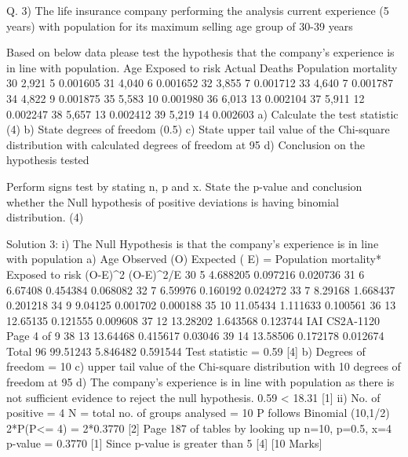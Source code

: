 \documentclass[a4paper,12pt]{article}
\begin{document}
Q. 3) The life insurance company performing the analysis current experience (5 years) with
population for its maximum selling age group of 30-39 years
\item  Based on below data please test the hypothesis that the company’s experience is in
line with population.
Age
Exposed to
risk
Actual
Deaths
Population
mortality
30 2,921 5 0.001605
31 4,040 6 0.001652
32 3,855 7 0.001712
33 4,640 7 0.001787
34 4,822 9 0.001875
35 5,583 10 0.001980
36 6,013 13 0.002104
37 5,911 12 0.002247
38 5,657 13 0.002412
39 5,219 14 0.002603
a) Calculate the test statistic (4)
b) State degrees of freedom (0.5)
c) State upper tail value of the Chi-square distribution with calculated degrees of
freedom at 95%
d) Conclusion on the hypothesis tested 
\item   Perform signs test by stating n, p and x. State the p-value and conclusion whether the
Null hypothesis of positive deviations is having binomial distribution. (4)


Solution 3:
i) The Null Hypothesis is that the company’s experience is in line with population
a)
Age Observed (O) Expected ( E) = Population mortality* Exposed to risk (O-E)^2 (O-E)^2/E
30 5 4.688205 0.097216 0.020736
31 6 6.67408 0.454384 0.068082
32 7 6.59976 0.160192 0.024272
33 7 8.29168 1.668437 0.201218
34 9 9.04125 0.001702 0.000188
35 10 11.05434 1.111633 0.100561
36 13 12.65135 0.121555 0.009608
37 12 13.28202 1.643568 0.123744
IAI CS2A-1120
Page 4 of 9
38 13 13.64468 0.415617 0.03046
39 14 13.58506 0.172178 0.012674
Total 96 99.51243 5.846482 0.591544
Test statistic = 0.59 [4]
b) Degrees of freedom = 10 
c) upper tail value of the Chi-square distribution with 10 degrees of freedom at 95%
d) The company’s experience is in line with population as there is not sufficient evidence to reject the
null hypothesis. 0.59 < 18.31 [1]
ii)
No. of positive = 4
N = total no. of groups analysed = 10
P follows Binomial (10,1/2)
2*P(P<= 4) = 2*0.3770
[2]
Page 187 of tables by looking up n=10, p=0.5, x=4
p-value = 0.3770 [1]
Since p-value is greater than 5%
[4]
[10 Marks]
\end{document}
